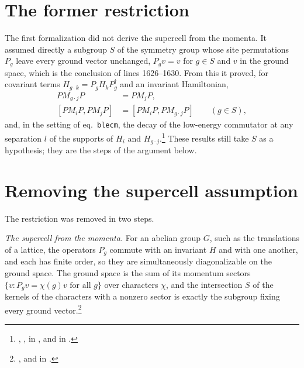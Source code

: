 \documentclass{article}
\begin{document}
\section{The former restriction}
The first formalization did not derive the supercell from the momenta. It
assumed directly a subgroup $S$ of the symmetry group whose site permutations
$P_g$ leave every ground vector unchanged, $P_gv=v$ for $g\in S$ and $v$ in
the ground space, which is the conclusion of lines 1626--1630. From this it
proved, for covariant terms $H_{g\cdot k}=P_gH_kP_g^\dagger$ and an invariant
Hamiltonian,
\begin{align}
    PM_{g\cdot j}P & =PM_jP,
    \label{eq:hastings05_translation_supercell_compression} \\
    [PM_iP,PM_jP]  & =[PM_iP,PM_{g\cdot j}P]\qquad(g\in S),
    \label{eq:hastings05_translation_supercell_commutator}
\end{align}
and, in the setting of eq.~\texttt{blecm}, the decay of the low-energy
commutator at any separation $l$ of the supports of $H_i$ and
$H_{g\cdot j}$.\footnote{,
    ,
    in , and
    in .}
These results still take $S$ as a hypothesis; they are the steps of the
argument below.

\section{Removing the supercell assumption}
The restriction was removed in two steps.

\emph{The supercell from the momenta.} For an abelian group $G$, such as the
translations of a lattice, the operators $P_g$ commute with an invariant $H$
and with one another, and each has finite order, so they are simultaneously
diagonalizable on the ground space. The ground space is the sum of its
momentum sectors $\{v:P_gv=\chi(g)v\text{ for all }g\}$ over characters
$\chi$, and the intersection $S$ of the kernels of the characters with a
nonzero sector is exactly the subgroup fixing every ground
vector.\footnote{,
     and
     in
    .}
\end{document}
